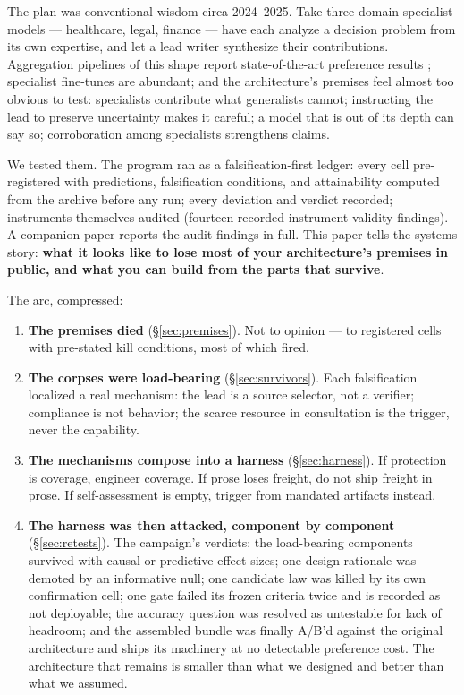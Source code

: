 \documentclass[11pt]{article}
\begin{document}
The plan was conventional wisdom circa 2024--2025. Take three
domain-specialist models --- healthcare, legal, finance --- have each
analyze a decision problem from its own expertise, and let a lead
writer synthesize their contributions. Aggregation pipelines of this
shape report state-of-the-art preference results
\cite{wang2024moa}; specialist fine-tunes are abundant; and the
architecture's premises feel almost too obvious to test: specialists
contribute what generalists cannot; instructing the lead to preserve
uncertainty makes it careful; a model that is out of its depth can say
so; corroboration among specialists strengthens claims.

We tested them. The program ran as a falsification-first ledger: every
cell pre-registered with predictions, falsification conditions, and
attainability computed from the archive before any run; every
deviation and verdict recorded; instruments themselves audited
(fourteen recorded instrument-validity findings). A companion paper
\cite{bobo2026audit} reports the audit findings in full. This paper
tells the systems story: \textbf{what it looks like to lose most of
your architecture's premises in public, and what you can build from
the parts that survive}.

The arc, compressed:

\begin{enumerate}
\item \textbf{The premises died} (\S\ref{sec:premises}). Not to opinion
--- to registered cells with pre-stated kill conditions, most of which
fired.
\item \textbf{The corpses were load-bearing} (\S\ref{sec:survivors}).
Each falsification localized a real mechanism: the lead is a source
selector, not a verifier; compliance is not behavior; the scarce
resource in consultation is the trigger, never the capability.
\item \textbf{The mechanisms compose into a harness}
(\S\ref{sec:harness}). If protection is coverage, engineer coverage. If
prose loses freight, do not ship freight in prose. If self-assessment
is empty, trigger from mandated artifacts instead.
\item \textbf{The harness was then attacked, component by component}
(\S\ref{sec:retests}). The campaign's verdicts: the load-bearing
components survived with causal or predictive effect sizes; one design
rationale was demoted by an informative null; one candidate law was
killed by its own confirmation cell; one gate failed its frozen
criteria twice and is recorded as not deployable; the accuracy
question was resolved as untestable for lack of headroom; and the
assembled bundle was finally A/B'd against the original architecture
and ships its machinery at no detectable preference cost. The
architecture that remains is smaller than what we designed and better
than what we assumed.
\end{enumerate}
\end{document}
